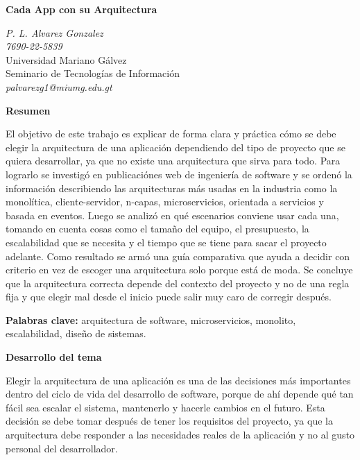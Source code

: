 \documentclass[12pt,letterpaper]{article}
\begin{document}
\begin{center}
\textbf{\Large Cada App con su Arquitectura}
\end{center}

\begin{center}
\textit{P. L. Alvarez Gonzalez} \\
\textit{7690-22-5839} \\
Universidad Mariano Gálvez \\
Seminario de Tecnologías de Información \\
\textit{palvarezg1@miumg.edu.gt} \\
\end{center}

\vspace{0.5cm}

\textbf{Resumen}

El objetivo de este trabajo es explicar de forma clara y práctica cómo se debe elegir la arquitectura de una aplicación dependiendo del tipo de proyecto que se quiera desarrollar, ya que no existe una arquitectura que sirva para todo. Para lograrlo se investigó en publicaciónes web de ingeniería de software y se ordenó la información describiendo las arquitecturas más usadas en la industria como la monolítica, cliente-servidor, n-capas, microservicios, orientada a servicios  y basada en eventos. Luego se analizó en qué escenarios conviene usar cada una, tomando en cuenta cosas como el tamaño del equipo, el presupuesto, la escalabilidad que se necesita y el tiempo que se tiene para sacar el proyecto adelante. Como resultado se armó una guía comparativa que ayuda a decidir con criterio en vez de escoger una arquitectura solo porque está de moda. Se concluye que la arquitectura correcta depende del contexto del proyecto y no de una regla fija y que elegir mal desde el inicio puede salir muy caro de corregir después.

\textbf{Palabras clave:} arquitectura de software, microservicios, monolito, escalabilidad, diseño de sistemas.

\textbf{Desarrollo del tema}

Elegir la arquitectura de una aplicación es una de las decisiones más importantes dentro del ciclo de vida del desarrollo de software, porque de ahí depende qué tan fácil sea escalar el sistema, mantenerlo y hacerle cambios en el futuro. Esta decisión se debe tomar después de tener los requisitos del proyecto, ya que la arquitectura debe responder a las necesidades reales de la aplicación y no al gusto personal del desarrollador.
\end{document}
